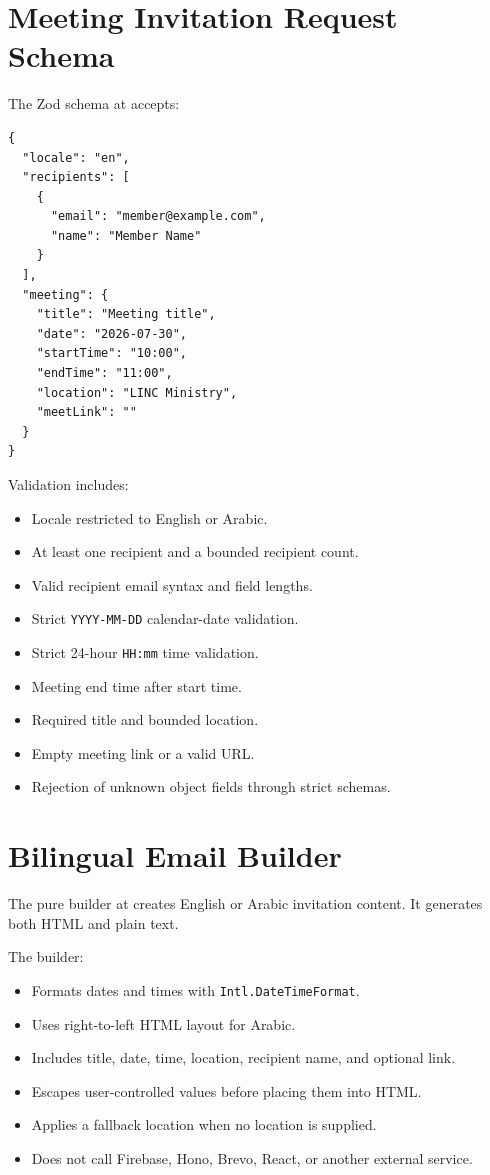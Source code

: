 \documentclass[11pt,a4paper,oneside]{report}
\begin{document}
\section{Meeting Invitation Request Schema}

The Zod schema at  accepts:

\begin{lstlisting}
{
  "locale": "en",
  "recipients": [
    {
      "email": "member@example.com",
      "name": "Member Name"
    }
  ],
  "meeting": {
    "title": "Meeting title",
    "date": "2026-07-30",
    "startTime": "10:00",
    "endTime": "11:00",
    "location": "LINC Ministry",
    "meetLink": ""
  }
}
\end{lstlisting}

Validation includes:

\begin{itemize}
  \item Locale restricted to English or Arabic.
  \item At least one recipient and a bounded recipient count.
  \item Valid recipient email syntax and field lengths.
  \item Strict \texttt{YYYY-MM-DD} calendar-date validation.
  \item Strict 24-hour \texttt{HH:mm} time validation.
  \item Meeting end time after start time.
  \item Required title and bounded location.
  \item Empty meeting link or a valid URL.
  \item Rejection of unknown object fields through strict schemas.
\end{itemize}

\section{Bilingual Email Builder}

The pure builder at  creates English or Arabic invitation content. It generates both HTML and plain text.

The builder:

\begin{itemize}
  \item Formats dates and times with \texttt{Intl.DateTimeFormat}.
  \item Uses right-to-left HTML layout for Arabic.
  \item Includes title, date, time, location, recipient name, and optional link.
  \item Escapes user-controlled values before placing them into HTML.
  \item Applies a fallback location when no location is supplied.
  \item Does not call Firebase, Hono, Brevo, React, or another external service.
\end{itemize}
\end{document}
